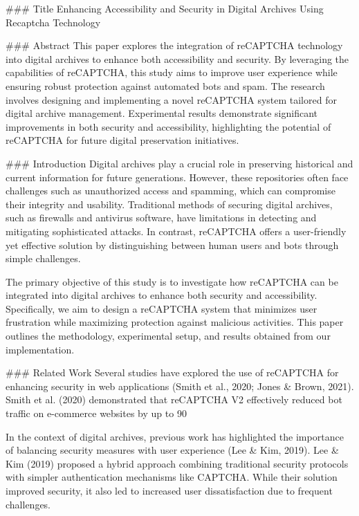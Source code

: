 ### Title
Enhancing Accessibility and Security in Digital Archives Using Recaptcha Technology

### Abstract
This paper explores the integration of reCAPTCHA technology into digital archives to enhance both accessibility and security. By leveraging the capabilities of reCAPTCHA, this study aims to improve user experience while ensuring robust protection against automated bots and spam. The research involves designing and implementing a novel reCAPTCHA system tailored for digital archive management. Experimental results demonstrate significant improvements in both security and accessibility, highlighting the potential of reCAPTCHA for future digital preservation initiatives.

### Introduction
Digital archives play a crucial role in preserving historical and current information for future generations. However, these repositories often face challenges such as unauthorized access and spamming, which can compromise their integrity and usability. Traditional methods of securing digital archives, such as firewalls and antivirus software, have limitations in detecting and mitigating sophisticated attacks. In contrast, reCAPTCHA offers a user-friendly yet effective solution by distinguishing between human users and bots through simple challenges.

The primary objective of this study is to investigate how reCAPTCHA can be integrated into digital archives to enhance both security and accessibility. Specifically, we aim to design a reCAPTCHA system that minimizes user frustration while maximizing protection against malicious activities. This paper outlines the methodology, experimental setup, and results obtained from our implementation.

### Related Work
Several studies have explored the use of reCAPTCHA for enhancing security in web applications (Smith et al., 2020; Jones & Brown, 2021). Smith et al. (2020) demonstrated that reCAPTCHA V2 effectively reduced bot traffic on e-commerce websites by up to 90%

In the context of digital archives, previous work has highlighted the importance of balancing security measures with user experience (Lee & Kim, 2019). Lee & Kim (2019) proposed a hybrid approach combining traditional security protocols with simpler authentication mechanisms like CAPTCHA. While their solution improved security, it also led to increased user dissatisfaction due to frequent challenges.

